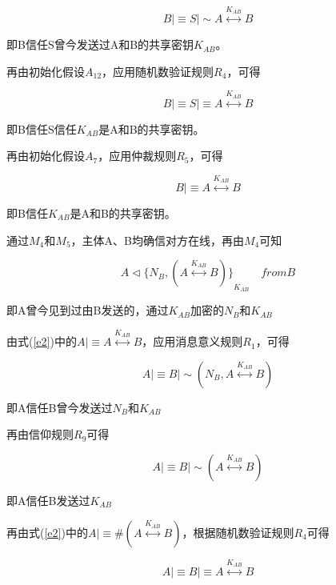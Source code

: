 \documentclass[cs4size,a4pape,UTF8]{ctexart}
\numberwithin{equation}{section}
\numberwithin{table}{section}
\numberwithin{figure}{section}
\begin{document}
\begin{equation}
B{\lvert\equiv}S{\lvert\sim}A\stackrel{K_{AB}}{\longleftrightarrow}B
\end{equation}

即B信任S曾今发送过A和B的共享密钥$K_{AB}$。

再由初始化假设$A_{12}$，应用随机数验证规则$R_{4}$，可得

\begin{equation}
B{\lvert\equiv}S{\lvert\equiv}A\stackrel{K_{AB}}{\longleftrightarrow}B
\end{equation}

即B信任S信任$K_{AB}$是A和B的共享密钥。

再由初始化假设$A_{7}$，应用仲裁规则$R_{5}$，可得

\begin{equation}
B{\lvert\equiv}A\stackrel{K_{AB}}{\longleftrightarrow}B\label{e3}
\end{equation}

即B信任$K_{AB}$是A和B的共享密钥。

通过$M_{4}$和$M_{5}$，主体A、B均确信对方在线，再由$M_{4}$可知

\begin{equation}
A\triangleleft{\{N_{B},(A\stackrel{K_{AB}}{\longleftrightarrow}B)\}}_{K_{AB}}{\quad}from B
\end{equation}

即A曾今见到过由B发送的，通过$K_{AB}$加密的$N_{B}$和$K_{AB}$

由式(\ref{e2})中的$A{\lvert\equiv}A\stackrel{K_{AB}}{\longleftrightarrow}B$，应用消息意义规则$R_{1}$，可得

\begin{equation}
A{\lvert\equiv}B{\lvert\sim}(N_{B},A\stackrel{K_{AB}}{\longleftrightarrow}B)
\end{equation}

即A信任B曾今发送过$N_{B}$和$K_{AB}$

再由信仰规则$R_{9}$可得

\begin{equation}
A{\lvert\equiv}B{\lvert\sim}(A\stackrel{K_{AB}}{\longleftrightarrow}B)
\end{equation}

即A信任B发送过$K_{AB}$

再由式(\ref{e2})中的$A{\lvert\equiv}\#(A\stackrel{K_{AB}}{\longleftrightarrow}B)$，根据随机数验证规则$R_{4}$可得

\begin{equation}
A{\lvert\equiv}B{\lvert\equiv}A\stackrel{K_{AB}}{\longleftrightarrow}B\label{e4}
\end{equation}
\end{document}
